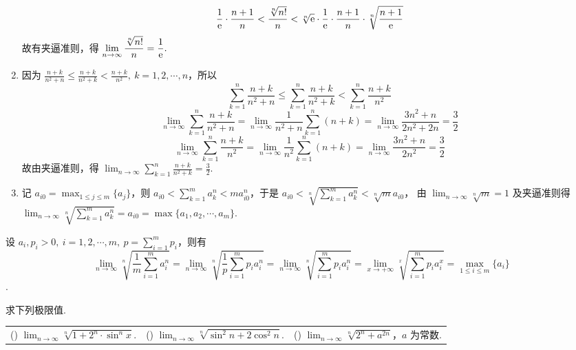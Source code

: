 \begin{solution}
\begin{enumerate}[label=(\arabic{*})]
              $$\frac{1}{\mathrm{e} }\cdot\frac{n+1}{n}<\frac{\sqrt[n]{n!}}{n}<\sqrt[n]{\mathrm{e} }\cdot\frac{1}{\mathrm{e} }\cdot\frac{n+1}{n}\cdot\sqrt[n]{\frac{n+1}{\mathrm{e} }}$$
              故有夹逼准则，得 $\displaystyle\lim_{n\to\infty}\frac{\sqrt[n]{n!}}{n}=\frac{1}{\mathrm{e} }.$
        \item 因为 $\displaystyle\frac{n+k}{n^2+n}\leqslant\frac{n+k}{n^2+k}<\frac{n+k}{n^2},~k=1,2,\cdots,n$，所以
              $$\sum_{k=1}^{n}\frac{n+k}{n^2+n}\leqslant\sum_{k=1}^{n}\frac{n+k}{n^2+k}<\sum_{k=1}^{n}\frac{n+k}{n^2}$$
              $$\lim_{n\to\infty}\sum_{k=1}^{n}\frac{n+k}{n^2+n}=\lim_{n\to\infty}\frac{1}{n^2+n}\sum_{k=1}^{n}(n+k)=\lim_{n\to\infty}\frac{3n^2+n}{2n^2+2n}=\frac{3}{2}$$
              $$\lim_{n\to\infty}\sum_{k=1}^{n}\frac{n+k}{n^2}=\lim_{n\to\infty}\frac{1}{n^2}\sum_{k=1}^{n}(n+k)=\lim_{n\to\infty}\frac{3n^2+n}{2n^2}=\frac{3}{2}$$
              故由夹逼准则，得 $\displaystyle\lim_{n\to\infty}\sum_{k=1}^{n}\frac{n+k}{n^2+k}=\frac{3}{2}.$
        \item 记 $\displaystyle a_{i0}=\max_{1\leqslant j\leqslant m}\{a_j\}$，则 $\displaystyle a_{i0}<\sum_{k=1}^{m}a_k^n<m a_{i0}^n$，于是 $\displaystyle a_{i0}<\sqrt[n]{\sum_{k=1}^{m}a_k^n}<\sqrt[n]{m}a_{i0}$，
              由 $\displaystyle\lim_{n\to\infty}\sqrt[n]{m}=1$ 及夹逼准则得 $\displaystyle\lim_{n\to\infty}\sqrt[n]{\sum_{k=1}^{m}a_k^n}=a_{i0}=\max\{a_1,a_2,\cdots,a_m\}.$
    \end{enumerate}
\end{solution}
\begin{inference}
    设 $\displaystyle a_i,p_i>0,~i=1,2,\cdots,m,~p=\sum_{i=1}^{m}p_i$，则有
    $$\displaystyle\lim_{n\to\infty}\sqrt[n]{\frac{1}{m}\sum_{i=1}^{m}a_i^n}=\displaystyle \lim_{n\to\infty}\sqrt[n]{\frac{1}{p}\sum_{i=1}^{m}p_ia_i^n}=\displaystyle \lim_{n\to\infty}\sqrt[n]{\sum_{i=1}^{m}p_ia_i^n}=\displaystyle \lim_{x\to+\infty}\sqrt[x]{\sum_{i=1}^{m}p_ia_i^x}=\max_{1\leqslant i\leqslant m}\{a_i\}$$.
    \label{maxai}
\end{inference}
\begin{example}
    求下列极限值.
    \setcounter{magicrownumbers}{0}
    \begin{table}[H]
        \centering
        \begin{tabular}{l | l | l}
            (\rownumber{}) $\displaystyle\lim_{n\to\infty}\sqrt[n]{1+2^n\cdot\sin^nx}.$ & (\rownumber{}) $\displaystyle\lim_{n\to\infty}\sqrt[n]{\sin^2n+2\cos^2n}.$ & (\rownumber{}) $\displaystyle\lim_{n\to\infty}\sqrt[n]{2^n+a^{2n}}$，$a$ 为常数.
        \end{tabular}
    \end{table}
\end{example}
